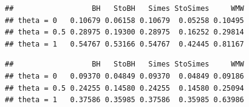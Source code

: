 \documentclass[
]{article}
\newenvironment{Shaded}{\begin{snugshade}}{\end{snugshade}}
\newcommand{\ControlFlowTok}[1]{\textcolor[rgb]{0.13,0.29,0.53}{\textbf{#1}}}
\newcommand{\DecValTok}[1]{\textcolor[rgb]{0.00,0.00,0.81}{#1}}
\newcommand{\FunctionTok}[1]{\textcolor[rgb]{0.00,0.00,0.00}{#1}}
\newcommand{\NormalTok}[1]{#1}
\newcommand{\OtherTok}[1]{\textcolor[rgb]{0.56,0.35,0.01}{#1}}
\newcommand{\SpecialCharTok}[1]{\textcolor[rgb]{0.00,0.00,0.00}{#1}}
\begin{document}
\begin{Shaded}
\end{Shaded}

\begin{verbatim}
##                  BH   StoBH   Simes StoSimes     WMW
## theta = 0   0.10679 0.06158 0.10679  0.05258 0.10495
## theta = 0.5 0.28975 0.19300 0.28975  0.16252 0.29814
## theta = 1   0.54767 0.53166 0.54767  0.42445 0.81167
\end{verbatim}

\begin{Shaded}
\end{Shaded}

\begin{verbatim}
##                  BH   StoBH   Simes StoSimes     WMW
## theta = 0   0.09370 0.04849 0.09370  0.04849 0.09186
## theta = 0.5 0.24255 0.14580 0.24255  0.14580 0.25094
## theta = 1   0.37586 0.35985 0.37586  0.35985 0.63986
\end{verbatim}
\end{document}
